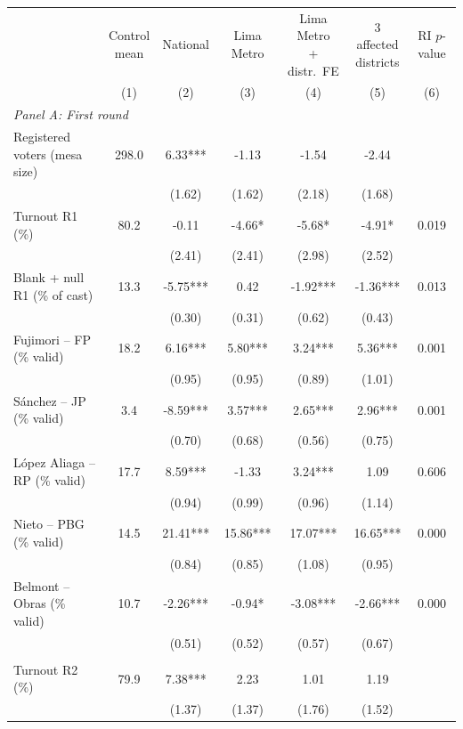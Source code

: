 \begin{tabular}{lcccccc}
\toprule
 & \shortstack{Control\\mean} & National & Lima Metro & \shortstack{Lima Metro\\+ distr.\ FE} & \shortstack{3 affected\\districts} & \shortstack{RI\\$p$-value} \\
 & (1) & (2) & (3) & (4) & (5) & (6) \\
\midrule
\multicolumn{7}{l}{\emph{Panel A: First round}} \\
Registered voters (mesa size) & 298.0 & 6.33*** & -1.13 & -1.54 & -2.44 &  \\
 &  & (1.62) & (1.62) & (2.18) & (1.68) &  \\[1pt]
Turnout R1 (\%) & 80.2 & -0.11 & -4.66* & -5.68* & -4.91* & 0.019 \\
 &  & (2.41) & (2.41) & (2.98) & (2.52) &  \\[1pt]
Blank + null R1 (\% of cast) & 13.3 & -5.75*** & 0.42 & -1.92*** & -1.36*** & 0.013 \\
 &  & (0.30) & (0.31) & (0.62) & (0.43) &  \\[1pt]
Fujimori -- FP (\% valid) & 18.2 & 6.16*** & 5.80*** & 3.24*** & 5.36*** & 0.001 \\
 &  & (0.95) & (0.95) & (0.89) & (1.01) &  \\[1pt]
S\'anchez -- JP (\% valid) & 3.4 & -8.59*** & 3.57*** & 2.65*** & 2.96*** & 0.001 \\
 &  & (0.70) & (0.68) & (0.56) & (0.75) &  \\[1pt]
L\'opez Aliaga -- RP (\% valid) & 17.7 & 8.59*** & -1.33 & 3.24*** & 1.09 & 0.606 \\
 &  & (0.94) & (0.99) & (0.96) & (1.14) &  \\[1pt]
Nieto -- PBG (\% valid) & 14.5 & 21.41*** & 15.86*** & 17.07*** & 16.65*** & 0.000 \\
 &  & (0.84) & (0.85) & (1.08) & (0.95) &  \\[1pt]
Belmont -- Obras (\% valid) & 10.7 & -2.26*** & -0.94* & -3.08*** & -2.66*** & 0.000 \\
 &  & (0.51) & (0.52) & (0.57) & (0.67) &  \\[1pt]
\addlinespace
\multicolumn{7}{l}{\emph{Panel B: Second round}} \\
Turnout R2 (\%) & 79.9 & 7.38*** & 2.23 & 1.01 & 1.19 &  \\
 &  & (1.37) & (1.37) & (1.76) & (1.52) &  \\[1pt]

\end{tabular}
